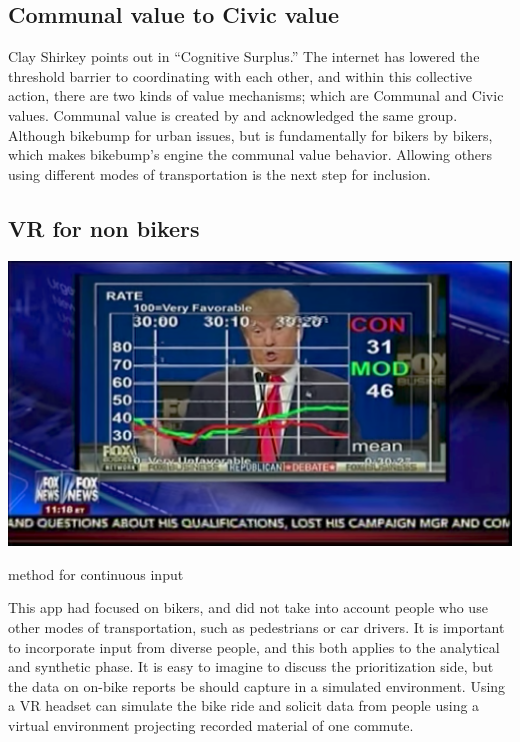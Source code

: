 \subsection{Communal value to Civic value}
Clay Shirkey points out in “Cognitive Surplus.” The internet has lowered the threshold barrier to coordinating with each other, and within this collective action, there are two kinds of value mechanisms; which are Communal and Civic values. Communal value is created by and acknowledged the same group. Although bikebump for urban issues, but is fundamentally for bikers by bikers, which makes bikebump's engine the communal value behavior. Allowing others using different modes of transportation is the next step for inclusion.

\subsection{VR for non bikers}

\begin{marginfigure}[{2cm}]
 	\includegraphics[width=\textwidth]{chapters/6/fig/pollester.png}               
 	 \caption{method for continuous input}
  	\label{fig:poll}
\end{marginfigure}
This app had focused on bikers, and did not take into account people who use other modes of transportation, such as pedestrians or car drivers. It is important to incorporate input from diverse people, and this both applies to the analytical and synthetic phase. It is easy to imagine to discuss the prioritization side, but the data on on-bike reports be should capture in a simulated environment.
Using a VR headset can simulate the bike ride and solicit data from people using a virtual environment projecting recorded material of one commute.




